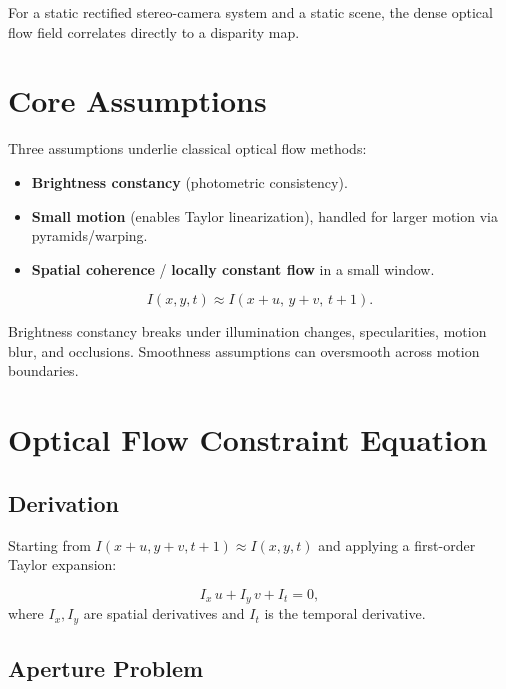 \documentclass[11pt, oneside]{book}
\begin{document}
\begin{notebox}[title={Stereo Connection}]
For a static rectified stereo-camera system and a static scene, the dense optical flow field correlates directly to a disparity map.
\end{notebox}

\section{Core Assumptions}

Three assumptions underlie classical optical flow methods:
\begin{itemize}
  \item \textbf{Brightness constancy} (photometric consistency).
  \item \textbf{Small motion} (enables Taylor linearization), handled for larger motion via pyramids/warping.
  \item \textbf{Spatial coherence} / \textbf{locally constant flow} in a small window.
\end{itemize}

\begin{defbox}[title={Brightness Constancy}]
\[
I(x,y,t)\approx I(x+u,\,y+v,\,t+1).
\]
\end{defbox}

Brightness constancy breaks under illumination changes, specularities, motion blur, and occlusions.
Smoothness assumptions can oversmooth across motion boundaries.

\section{Optical Flow Constraint Equation}

\subsection{Derivation}

Starting from $I(x+u,y+v,t+1)\approx I(x,y,t)$ and applying a first-order Taylor expansion:

\begin{thmbox}[title={Optical Flow Constraint Equation (OFCE)}]
\[
I_x\,u + I_y\,v + I_t = 0,
\]
where $I_x,I_y$ are spatial derivatives and $I_t$ is the temporal derivative.
\end{thmbox}

\subsection{Aperture Problem}
\end{document}
